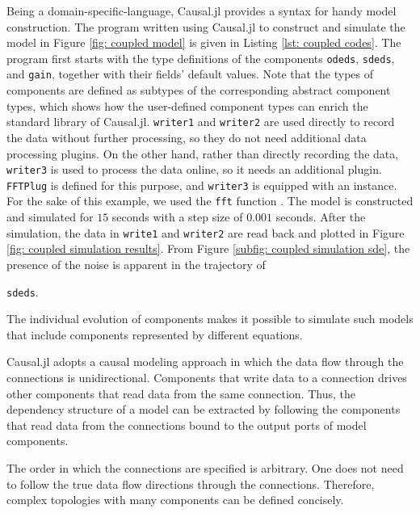\documentclass{juliacon}
\begin{document}
Being a domain-specific-language, Causal.jl provides a syntax for handy model construction. The program written using Causal.jl to construct and simulate the model in Figure \ref{fig: coupled model} is given in Listing \ref{lst: coupled codes}. The program first starts with the type definitions of the components \texttt{odeds}, \texttt{sdeds}, and \texttt{gain}, together with their fields' default values. Note that the types of components are defined as subtypes of the corresponding abstract component types, which shows how the user-defined component types can enrich the standard library of Causal.jl. \texttt{writer1} and \texttt{writer2} are used directly to record the data without further processing, so they do not need additional data processing plugins.
On the other hand, rather than directly recording the data, \texttt{writer3} is used to process the data online, so it needs an additional plugin. \texttt{FFTPlug} is defined for this purpose, and \texttt{writer3} is equipped with an instance. For the sake of this example, we used the \texttt{fft} function \cite{fftw}. The model is constructed and simulated for $15$ seconds with a step size of $0.001$ seconds. After the simulation, the data in \texttt{write1} and \texttt{writer2} are read back and plotted in Figure \ref{fig: coupled simulation results}. From Figure \ref{subfig: coupled simulation sde}, the presence of the noise is apparent in the trajectory of {\texttt{sdeds}. 

The individual evolution of components makes it possible to simulate such models that include components represented by different equations. 

Causal.jl adopts a causal modeling approach in which the data flow through the connections is unidirectional. Components that write data to a connection drives other components that read data from the same connection. Thus, the dependency structure of a model can be extracted by following the components that read data from the connections bound to the output ports of model components.

The order in which the connections are specified is arbitrary. One does not need to follow the true data flow directions through the connections. Therefore, complex topologies with many components can be defined concisely.

}
\end{document}
